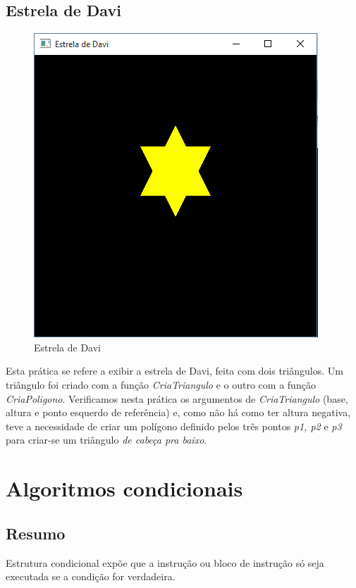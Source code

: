 \section{Estrela de Davi}
\begin{figure}[ht]
  \centerline{\includegraphics[width=.5\textwidth]{img/cap1_ex2.png}}
  \caption{Estrela de Davi}
  \label{fig:cap01_ex3}
\end{figure}
Esta prática se refere a exibir a estrela de Davi, feita com dois triângulos. Um triângulo foi criado com a função \emph{CriaTriangulo} e o outro com a função \emph{CriaPoligono}. Verificamos nesta prática os argumentos de \emph{CriaTriangulo} (base, altura e ponto esquerdo de referência) e, como não há como ter altura negativa, teve a necessidade de criar um polígono definido pelos três pontos \emph{p1, p2} e \emph{p3} para criar-se um triângulo \emph{de cabeça pra baixo}.



\chapter[Algoritmos condicionais]
{Algoritmos condicionais}



\section{Resumo}

Estrutura condicional expõe que a instrução ou bloco de instrução só seja executada se a condição for verdadeira.


%
%

